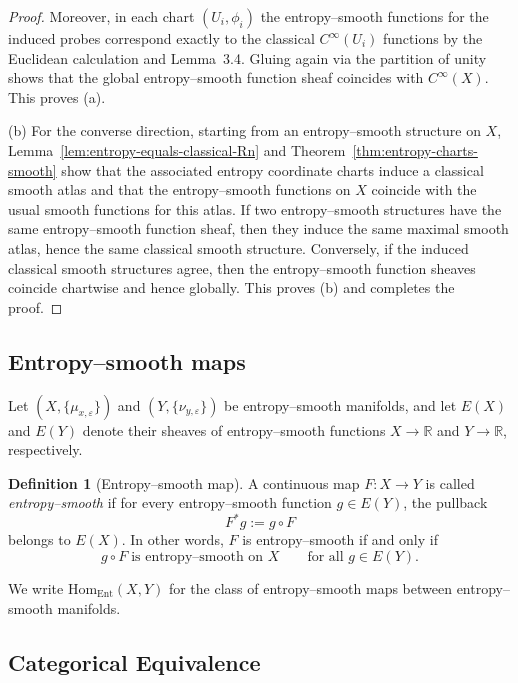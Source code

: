 \documentclass[11pt]{amsart}
\theoremstyle{definition}
\newtheorem{definition}[theorem]{Definition}
\theoremstyle{remark}
\begin{document}
\begin{proof}
Moreover, in each chart $(U_i,\phi_i)$ the entropy–smooth functions for the induced probes
correspond exactly to the classical $C^\infty(U_i)$ functions by the Euclidean calculation and
Lemma~3.4. Gluing again via the partition of unity shows that the global entropy–smooth
function sheaf coincides with $C^\infty(X)$. This proves (a).

\medskip\noindent
(b) For the converse direction, starting from an entropy–smooth structure on $X$, Lemma~\ref{lem:entropy-equals-classical-Rn}
and Theorem~\ref{thm:entropy-charts-smooth} show that the associated entropy coordinate charts induce a classical smooth
atlas and that the entropy–smooth functions on $X$ coincide with the usual smooth functions
for this atlas. If two entropy–smooth structures have the same entropy–smooth function sheaf,
then they induce the same maximal smooth atlas, hence the same classical smooth structure.
Conversely, if the induced classical smooth structures agree, then the entropy–smooth function
sheaves coincide chartwise and hence globally. This proves (b) and completes the proof.
\end{proof}


\subsection{Entropy–smooth maps}

Let $(X,\{\mu_{x,\varepsilon}\})$ and $(Y,\{\nu_{y,\varepsilon}\})$ be entropy–smooth manifolds, and let 
$E(X)$ and $E(Y)$ denote their sheaves of entropy–smooth functions $X\longrightarrow \mathbb{R}$ and $Y\longrightarrow \mathbb{R}$, respectively.

\begin{definition}[Entropy--smooth map]
A continuous map $F:X\to Y$ is called \emph{entropy--smooth} if for every entropy--smooth 
function $g\in E(Y)$, the pullback 
\[
F^*g := g\circ F
\]
belongs to $E(X)$. In other words, $F$ is entropy--smooth if and only if
\[
g\circ F \;\text{is entropy--smooth on }X
\qquad\text{for all } g\in E(Y).
\]
\end{definition}

\noindent
We write $\mathrm{Hom}_{\mathrm{Ent}}(X,Y)$ for the class of entropy--smooth maps 
between entropy--smooth manifolds.


\subsection{Categorical Equivalence}
\end{document}
